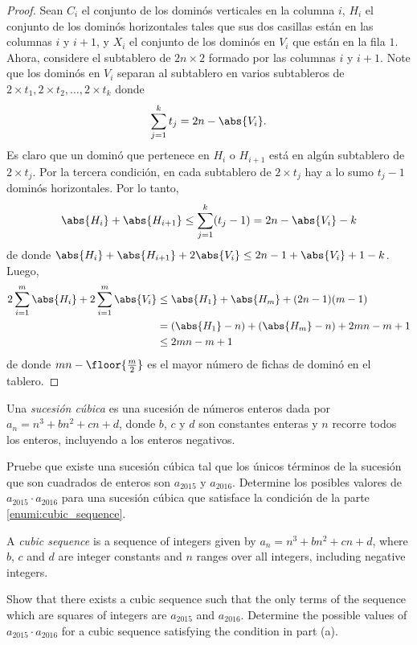 \begin{proof}
  Sean $C_i$ el conjunto de los dominós verticales en la columna $i$, $H_i$ el
  conjunto de los dominós horizontales tales que sus dos casillas están en las
  columnas $i$ y $i+1$, y $X_i$ el conjunto de los dominós en $V_i$ que están en
  la fila $1$. Ahora, considere el subtablero de $2n\times 2$ formado por las
  columnas $i$ y $i+1$. Note que los dominós en $V_i$ separan al subtablero en
  varios subtableros de $2\times t_1,2\times t_2,\dots,2\times t_k$ donde
  \[\sum_{j=1}^k t_j=2n-\abs{V_i}.\]
  Es claro que un dominó que pertenece en $H_i$ o $H_{i+1}$ está en algún
  subtablero de $2\times t_j$. Por la tercera condición, en cada subtablero de
  $2\times t_j$ hay a lo sumo $t_j-1$ dominós horizontales. Por lo tanto,
  \[\abs{H_i}+\abs{H_{i+1}}\le\sum_{j=1}^k(t_j-1)=2n-\abs{V_i}-k\]
  de donde $\abs{H_i}+\abs{H_{i+1}}+2\abs{V_i}\le 2n-1+\abs{V_i}+1-k$. Luego,
  \begin{align*}
    2\sum_{i=1}^m\abs{H_i}+2\sum_{i=1}^m\abs{V_i}
    &\le \abs{H_1}+\abs{H_m}+(2n-1)(m-1) \\
    &= (\abs{H_1}-n)+(\abs{H_m}-n)+2mn-m+1 \\
    &\le 2mn-m+1
  \end{align*}
  de donde $mn-\floor{\frac{m}{2}}$ es el mayor número de fichas de dominó en el
  tablero.
\end{proof}

\begin{problem}[RMM 2016/3]
  Una \emph{sucesión cúbica} es una sucesión de números enteros dada por
  $a_n=n^3+bn^2+cn+d$, donde $b$, $c$ y $d$ son constantes enteras y $n$ recorre
  todos los enteros, incluyendo a los enteros negativos.
  \begin{enumerate}[(a)]
    \ii\label{enumi:cubic_sequence} Pruebe que existe una sucesión cúbica tal
    que los únicos términos de la sucesión que son cuadrados de enteros son
    $a_{2015}$ y $a_{2016}$.
    \ii Determine los posibles valores de $a_{2015}\cdot a_{2016}$ para una
    sucesión cúbica que satisface la condición de la parte
    \ref{enumi:cubic_sequence}.
  \end{enumerate}
  \begin{hint}
    A \emph{cubic sequence} is a sequence of integers given by
    $a_n=n^3+bn^2+cn+d$, where $b$, $c$ and $d$ are integer constants and $n$
    ranges over all integers, including negative integers.
    \begin{enumerate}[(a)]
      \ii Show that there exists a cubic sequence such that the only terms of
      the sequence which are squares of integers are $a_{2015}$ and $a_{2016}$.
      \ii Determine the possible values of $a_{2015}\cdot a_{2016}$ for a cubic
      sequence satisfying the condition in part (a).
    \end{enumerate}
  \end{hint}
\end{problem}

